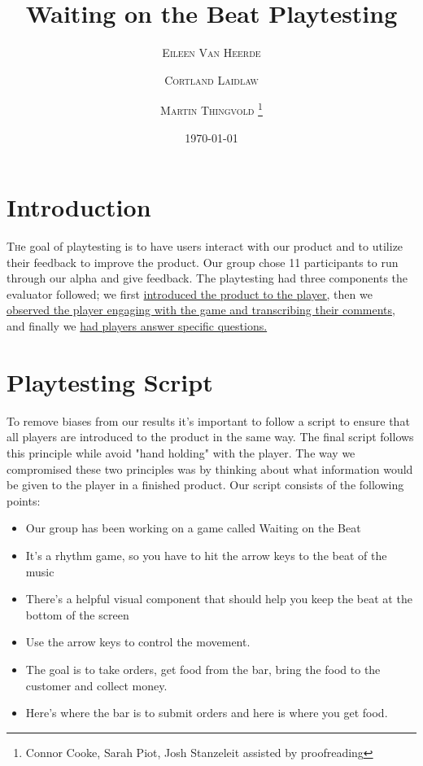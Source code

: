 \documentclass[twoside,twocolumn]{article}
\title{Waiting on the Beat Playtesting} %
\author{%
\textsc{Eileen Van Heerde}
\and
\textsc{Cortland Laidlaw}
\and
\textsc{Martin Thingvold} \thanks{Connor Cooke, Sarah Piot, Josh Stanzeleit assisted by proofreading}\\
}
\date{\today} %
\begin{document}
\maketitle


\section{Introduction}

\lettrine[nindent=0em,lines=3]{T} he goal of playtesting is to have users interact
with our product and to utilize their feedback to improve the product. Our group chose
11
participants to run through our alpha and give feedback. The playtesting had three components the evaluator followed; we first \hyperlink{section.2}{introduced the product to the player,} then we \hyperlink{section.3}{observed the player engaging with the
game and transcribing their comments,} and finally we \hyperlink{section.4}{had players answer specific questions.}





\section{Playtesting Script}
\label{sec:script}
To remove biases from our results it's important to follow a script to ensure that all players are introduced
to the product in the same way. The final script follows this principle while avoid "hand holding" with the player.
The way we compromised these two principles was by thinking about what information would be given to the player in a finished product. Our script consists of the following points:

\begin{itemize}
\item Our group has been working on a game called Waiting on the Beat
\item It's a rhythm game, so you have to hit the arrow keys to the beat of the music
\item There's a helpful visual component that should help you keep the beat at the bottom of the screen
\item Use the arrow keys to control the movement.
\item The goal is to take orders, get food from the bar, bring the food to the customer and collect money.
\item Here's where the bar is to submit orders and here is where you get food.
\end{itemize}
\end{document}
